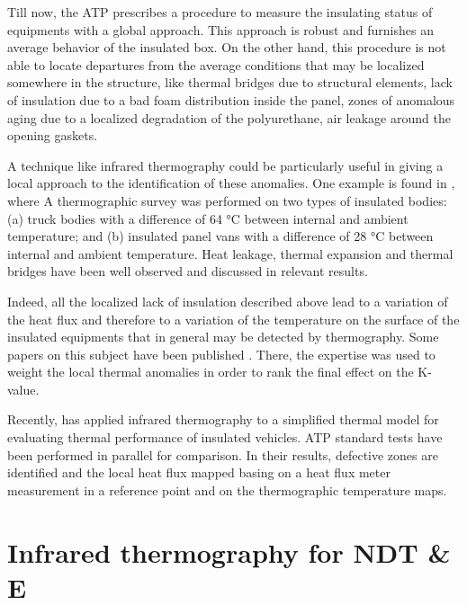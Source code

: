 Till now, the ATP prescribes a procedure to measure the insulating status of equipments with a global approach. This approach is robust and furnishes an average behavior of the insulated box. On the other hand, this procedure is not able to locate departures from the average conditions that may be localized somewhere in the structure, like thermal bridges due to structural elements, lack of insulation due to a bad foam distribution inside the panel, zones of anomalous aging due to a localized degradation of the polyurethane, air leakage around the opening gaskets. 

A technique like infrared thermography could be particularly useful in giving a local approach to the identification of these anomalies. One example is found in \citep{Estrada-Flores1996use}, where A thermographic survey was performed on two types of insulated bodies: (a) truck bodies with a difference of 64 °C between internal and ambient temperature; and (b) insulated panel vans with a difference of 28 °C between internal and ambient temperature. Heat leakage, thermal expansion and thermal bridges have been well observed and discussed in relevant results.

Indeed, all the localized lack of insulation described above lead to a variation of the heat flux and therefore to a variation of the temperature on the surface of the insulated equipments that in general may be detected by thermography. Some papers on this subject have been published \citep{grinzatoquality,grinzato1comparison}. There, the expertise was used to weight the local thermal anomalies in order to rank the final effect on the K-value. %

Recently, \citep{rossi2009k} has applied infrared thermography to a simplified thermal model for evaluating thermal performance of insulated vehicles. ATP standard tests have been performed in parallel for comparison. In their results, defective zones are identified and the local heat flux mapped basing on a heat flux meter measurement in a reference point and on the thermographic temperature maps.


\section*{Infrared thermography for NDT \& E}

